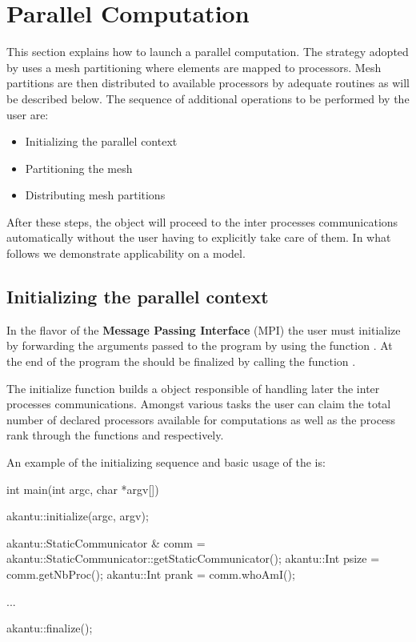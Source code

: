 \newpage
\section{Parallel Computation}

This section explains how to launch a parallel computation.
The strategy adopted by \akantu uses a mesh partitioning 
where elements are mapped to processors. Mesh partitions are
then distributed to available processors by adequate routines
as will be described below.  
The sequence of additional operations to be performed by the user are:

\begin{itemize}
\item Initializing the parallel context
\item Partitioning the mesh
\item Distributing mesh partitions
\end{itemize}

After these steps, the 
object will proceed to the inter processes communications automatically
without the user having to explicitly take care of them.
In what follows we demonstrate applicability on a 
 model.

\subsection{Initializing the parallel context}

In the flavor of the \textbf{Message Passing Interface} (MPI) 
the user must initialize \akantu by forwarding the arguments passed to the program
by using the function . At the end of the program the 
\akantu should be finalized by calling the function .  

The initialize function builds a  object 
responsible of handling later the inter processes communications.
Amongst various tasks the user can claim the total number of declared 
processors available for computations as well as the process rank through 
the functions  and  respectively.

An example of the initializing sequence and basic usage of the 
 is:

\begin{cpp}
int main(int argc, char *argv[])
{
  akantu::initialize(argc, argv);

  akantu::StaticCommunicator & comm =
  akantu::StaticCommunicator::getStaticCommunicator();
  akantu::Int psize = comm.getNbProc();
  akantu::Int prank = comm.whoAmI();

  ... 

  akantu::finalize();
}
\end{cpp} 

